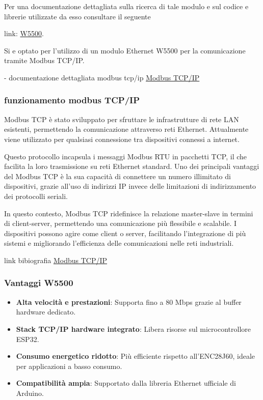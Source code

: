 \documentclass[12pt,a4paper]{report}
\begin{document}

Per una documentazione dettagliata sulla ricerca di tale modulo e sul codice e librerie utilizzate da esso consultare il seguente 

link: \href{https://github.com/AlessioTommasi-supsi/iotProject/blob/main/docs/ResearchEthModule/W5500Example/README.md}{W5500}.

Si e optato per l'utilizzo di un modulo Ethernet W5500 per la comunicazione tramite Modbus TCP/IP.

- documentazione dettagliata modbus tcp/ip \href{https://www.modbus.org/docs/Modbus_Messaging_Implementation_Guide_V1_0b.pdf}{Modbus TCP/IP}

\subsubsection{funzionamento modbus TCP/IP }
Modbus TCP è stato sviluppato per sfruttare le infrastrutture di rete LAN esistenti, permettendo la comunicazione attraverso reti Ethernet. Attualmente viene utilizzato per qualsiasi connessione tra dispositivi connessi a internet.

Questo protocollo incapsula i messaggi Modbus RTU in pacchetti TCP, il che facilita la loro trasmissione su reti Ethernet standard. Uno dei principali vantaggi del Modbus TCP è la sua capacità di connettere un numero illimitato di dispositivi, grazie all’uso di indirizzi IP invece delle limitazioni di indirizzamento dei protocolli seriali.

In questo contesto, Modbus TCP ridefinisce la relazione master-slave in termini di client-server, permettendo una comunicazione più flessibile e scalabile. I dispositivi possono agire come client o server, facilitando l’integrazione di più sistemi e migliorando l’efficienza delle comunicazioni nelle reti industriali.

link bibiografia \href{https://v2charge.com/it/che-cose-modbus-rtu-tpc/}{Modbus TCP/IP}

\subsubsection{Vantaggi W5500}
\begin{itemize}
    \item \textbf{Alta velocità e prestazioni}: Supporta fino a 80 Mbps grazie al buffer hardware dedicato.
    \item \textbf{Stack TCP/IP hardware integrato}: Libera risorse sul microcontrollore ESP32.
    \item \textbf{Consumo energetico ridotto}: Più efficiente rispetto all’ENC28J60, ideale per applicazioni a basso consumo.
    \item \textbf{Compatibilità ampia}: Supportato dalla libreria Ethernet ufficiale di Arduino.
\end{itemize}
\end{document}
